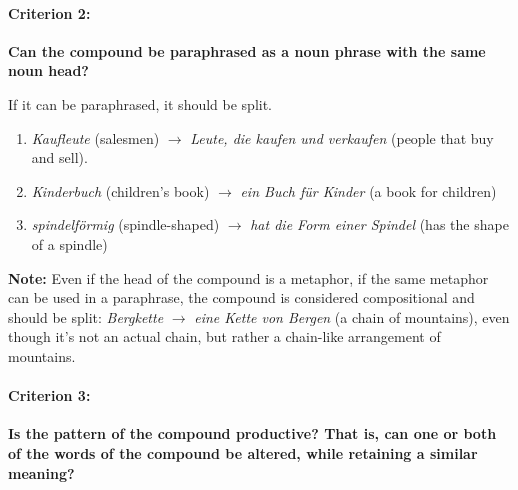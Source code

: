 \documentclass[11pt]{article}
\begin{document}
\paragraph{Criterion 2:} {\bf Can the compound be paraphrased as a noun phrase with the same noun head?}

If it can be paraphrased, it should be split.

\begin{enumerate}
\item
{\it Kaufleute} (salesmen) $\rightarrow$ {\it Leute, die kaufen und verkaufen} (people that buy and sell).
\item
{\it Kinderbuch} (children's book) $\rightarrow$ {\it ein Buch f\"{u}r Kinder} (a book for children)
\item
{\it spindelf\"{o}rmig} (spindle-shaped) $\rightarrow$ {\it hat die Form einer Spindel} (has the shape of a spindle)
\end{enumerate}

{\bf Note:} Even if the head of the compound is a metaphor, if the same metaphor can be used in a paraphrase, the compound is considered compositional and should be split: {\it Bergkette} $\rightarrow$ {\it eine Kette von Bergen} (a chain of mountains), even though it's not an actual chain, but rather a chain-like arrangement of mountains.


\paragraph{Criterion 3:} {\bf Is the pattern of the compound productive? That is, can one or both of the words of the compound be altered, while retaining a similar meaning?}
\end{document}
